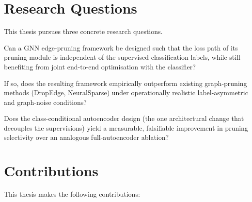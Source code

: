 \documentclass[11pt,a4paper]{report}
\theoremstyle{definition}
\theoremstyle{remark}
\begin{document}
\section{Research Questions}

This thesis pursues three concrete research questions.

\begin{description}[leftmargin=2em,style=nextline]
\item[\textbf{RQ1.}]
Can a GNN edge-pruning framework be designed such that the loss path of
its pruning module is independent of the supervised classification
labels, while still benefiting from joint end-to-end optimisation with
the classifier?
\item[\textbf{RQ2.}]
If so, does the resulting framework empirically outperform existing
graph-pruning methods (DropEdge, NeuralSparse) under operationally
realistic label-asymmetric and graph-noise conditions?
\item[\textbf{RQ3.}]
Does the class-conditional autoencoder design (the one architectural
change that decouples the supervisions) yield a measurable, falsifiable
improvement in pruning selectivity over an analogous full-autoencoder
ablation?
\end{description}

\section{Contributions}

This thesis makes the following contributions:
\end{document}
